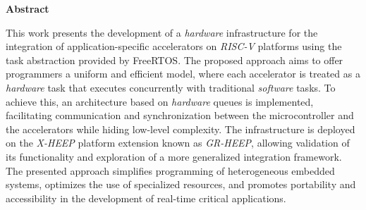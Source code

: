 \thispagestyle{empty}

\parindent=16mm

\vspace*{2cm}

\begin{flushleft}
  \begin{Large}
    \textbf{Abstract}\\
  \end{Large}
  \masterRule
\end{flushleft}

\vspace*{1cm}

This work presents the development of a \textit{hardware} infrastructure for the integration of application-specific accelerators on \textit{RISC-V} platforms using the task abstraction provided by FreeRTOS. The proposed approach aims to offer programmers a uniform and efficient model, where each accelerator is treated as a \textit{hardware} task that executes concurrently with traditional \textit{software} tasks. To achieve this, an architecture based on \textit{hardware} queues is implemented, facilitating communication and synchronization between the microcontroller and the accelerators while hiding low-level complexity. The infrastructure is deployed on the \textit{X-HEEP} platform extension known as \textit{GR-HEEP}, allowing validation of its functionality and exploration of a more generalized integration framework. The presented approach simplifies programming of heterogeneous embedded systems, optimizes the use of specialized resources, and promotes portability and accessibility in the development of real-time critical applications.